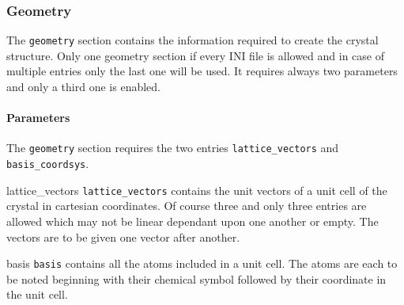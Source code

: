 \subsubsection{Geometry}
The \lstinline{geometry} section contains the information required to create the crystal structure. Only one geometry section if every INI file is allowed and in case of multiple entries only the last one will be used. It requires always two parameters and only a third one is enabled.

\paragraph{Parameters}
The \lstinline{geometry} section requires the two entries \lstinline{lattice_vectors} and \lstinline{basis_coordsys}.
\begin{description}
 \item{lattice\_vectors} \lstinline{lattice_vectors} contains the unit vectors of a unit cell of the crystal in cartesian coordinates. Of course three and only three entries are allowed which may not be linear dependant upon one another or empty. The vectors are to be given one vector after another.
 \item{basis} \lstinline{basis} contains all the atoms included in a unit cell. The atoms are each to be noted beginning with their chemical symbol followed by their coordinate in the unit cell.
\end{description}


